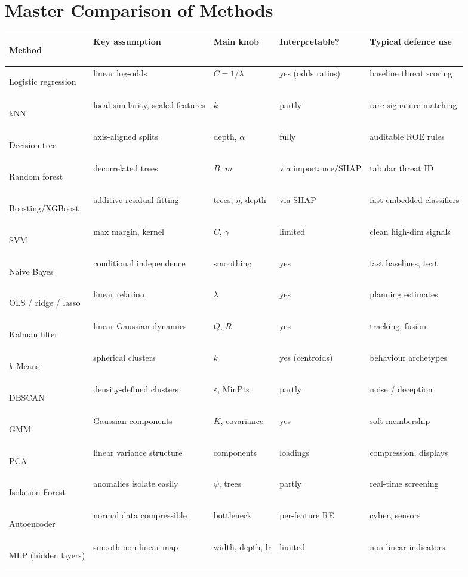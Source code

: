 \documentclass[11pt]{article}
\begin{document}
\section{Master Comparison of Methods}
\begin{center}\scriptsize\renewcommand{\arraystretch}{1.25}
\begin{tabularx}{\textwidth}{>{\bfseries\raggedright\arraybackslash}p{2.5cm}p{2.6cm}p{2.3cm}>{\raggedright\arraybackslash}p{1.9cm}X}\toprule Method & Key assumption & Main knob & Interpret\-able?  & Typical defence use\\\midrule
Logistic regression & linear log-odds & $C=1/\lambda$ & yes (odds ratios) & baseline threat scoring\\
kNN & local similarity, scaled features & $k$ & partly & rare-signature matching\\
Decision tree & axis-aligned splits & depth, $\alpha$ & fully & auditable ROE rules\\
Random forest & decorrelated trees & $B$, $m$ & via importance/SHAP & tabular threat ID\\
Boosting/\allowbreak XGBoost & additive residual fitting & trees, $\eta$, depth & via SHAP & fast embedded classifiers\\
SVM & max margin, kernel & $C$, $\gamma$ & limited & clean high-dim signals\\
Naive Bayes & conditional independence & smoothing & yes & fast baselines, text\\
OLS / ridge / lasso & linear relation & $\lambda$ & yes & planning estimates\\
Kalman filter & linear-Gaussian dynamics & $Q$, $R$ & yes & tracking, fusion\\
$k$-Means & spherical clusters & $k$ & yes (centroids) & behaviour archetypes\\
DBSCAN & density-defined clusters & $\varepsilon$, MinPts & partly & noise / deception\\
GMM & Gaussian components & $K$, covariance & yes & soft membership\\
PCA & linear variance structure & components & loadings & compression, displays\\
Isolation Forest & anomalies isolate easily & $\psi$, trees & partly & real-time screening\\
Autoencoder & normal data compressible & bottleneck & per-feature RE & cyber, sensors\\
MLP (hidden layers) & smooth non-linear map & width, depth, lr & limited & non-linear indicators\\

\end{tabularx}
\end{center}
\end{document}
